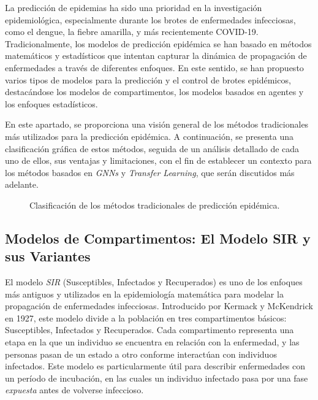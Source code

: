 La predicción de epidemias ha sido una prioridad en la investigación epidemiológica, especialmente durante los brotes de enfermedades infecciosas, como el dengue, la fiebre amarilla, y más recientemente COVID-19. Tradicionalmente, los modelos de predicción epidémica se han basado en métodos matemáticos y estadísticos que intentan capturar la dinámica de propagación de enfermedades a través de diferentes enfoques\parencite{Kermack1927ACT, Chowell2016EarlyGrowth, Burke2024OriginsSEIR}. En este sentido, se han propuesto varios tipos de modelos para la predicción y el control de brotes epidémicos, destacándose los modelos de compartimentos\parencite{Kermack1927ACT, Chowell2016EarlyGrowth, Mata2021MathematicalEpidemics}, los modelos basados en agentes y los enfoques estadísticos\parencite{Rodriguez2022DataCentric, Nowzari2016ComplexNetworks}.

En este apartado, se proporciona una visión general de los métodos tradicionales más utilizados para la predicción epidémica. A continuación, se presenta una clasificación gráfica de estos métodos, seguida de un análisis detallado de cada uno de ellos, sus ventajas y limitaciones, con el fin de establecer un contexto para los métodos basados en \textit{GNNs}  y \textit{Transfer Learning}, que serán discutidos más adelante\parencite{Nguyen2023NZSTGNN, Zheng2024HeatGNN}.

\begin{figure}[H]
\centering
\caption{Clasificación de los métodos tradicionales de predicción epidémica\parencite{Mata2021MathematicalEpidemics, Rodriguez2022DataCentric}.}
\end{figure}

\subsection{Modelos de Compartimentos: El Modelo SIR y sus Variantes}\label{section:sir-model}

El modelo \textit{SIR} (Susceptibles, Infectados y Recuperados) es uno de los enfoques más antiguos y utilizados en la epidemiología matemática para modelar la propagación de enfermedades infecciosas. Introducido por Kermack y McKendrick en 1927\parencite{Kermack1927ACT}, este modelo divide a la población en tres compartimentos básicos: Susceptibles, Infectados y Recuperados. Cada compartimento representa una etapa en la que un individuo se encuentra en relación con la enfermedad, y las personas pasan de un estado a otro conforme interactúan con individuos infectados. Este modelo es particularmente útil para describir enfermedades con un período de incubación, en las cuales un individuo infectado pasa por una fase \textit{expuesta} antes de volverse infeccioso\parencite{Mata2021MathematicalEpidemics}. 

